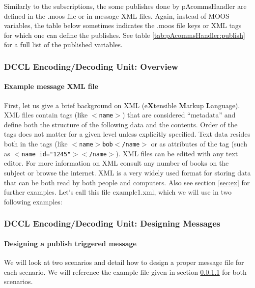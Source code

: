 \documentclass[11pt, letterpaper, oneside]{memoir}
\newcommand{\xmltag}[1]{\texttt{$<$#1$>$}}
\begin{document}
Similarly to the subscriptions, the some publishes done by pAcommsHandler
are defined in the .moos file or in message XML files. Again, instead of MOOS variables,
the table below sometimes indicates the .moos file keys or XML tags for which one can define
the publishes. See table \ref{tab:pAcommsHandler:publish} for a full list of the published variables.

\subsubsection{DCCL Encoding/Decoding Unit: Overview} \label{sec:dccl_overview}

\paragraph{Example message XML file} \label{sec:ex_xml}

 First, let us give a brief background on XML (e\textbf{X}tensible \textbf{M}arkup
 \textbf{L}anguage). XML files contain tags (like
 \xmltag{name}) that are considered ``metadata'' and define both
 the structure of the following data and the contents. Order of the
 tags does not matter for a given level unless explicitly
 specified. Text data resides both in the tags (like
 \xmltag{name$>$bob$<$/name} or as attributes of the tag (such as
 \xmltag{name id="1245"$><$/name}). XML files can be edited with any
 text editor. For more information on XML consult any number of books
 on the subject or browse the internet. XML is a very widely used
 format for storing data that can be both read by both people and
 computers. Also see section \ref{sec:ex} for further examples. Let's call this file example1.xml, which we will use in two following examples:

\begin{small}

\end{small}

\subsubsection{DCCL Encoding/Decoding Unit: Designing Messages}

\paragraph{Designing a publish triggered message}  \label{sec:design}
We will look at two scenarios and detail how to design a proper message file for each scenario. We will reference the example file given in section \ref{sec:ex_xml} for both scenarios.
\end{document}
